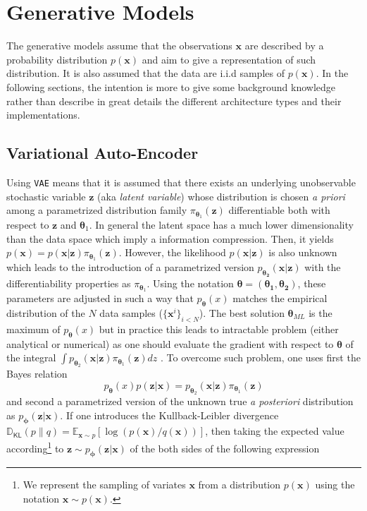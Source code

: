 \documentclass[11pt]{amsart}
\newcommand{\Esp}[0]{\ensuremath{\mathbb{E}}}
\newcommand{\DKL}[0]{\ensuremath{\mathbb{D}_{\mathsf{KL}}}}
\begin{document}
\section{Generative Models}
%
The generative models assume that the observations $\bm{x}$ are described by a probability distribution $p(\bm{x})$ and aim to give a representation of such distribution.  It is also assumed that the data are i.i.d samples of $p(\bm{x})$.  In the following sections, the intention is more to give some background knowledge rather than describe in great details the different  architecture types and their implementations.
%
\subsection{Variational Auto-Encoder}
%
Using \texttt{VAE} \citep{Kingma2014} means that it is assumed that there exists an underlying unobservable stochastic variable $\bm{z}$  (aka \textit{latent variable}) whose distribution is chosen \textit{a priori} among a parametrized distribution family $\pi_{\bm{\theta}_1}(\bm{z})$ differentiable both with respect to $\bm{z}$ and $\bm{\theta}_1$. In general the latent space has a much lower dimensionality than the data space which imply a information compression. Then, it yields $p(\bm{x}) = p(\bm{x}|\bm{z})\pi_{\bm{\theta}_1}(\bm{z})$. However, the likelihood  $p(\bm{x}|\bm{z})$ is also unknown which leads to the introduction of a parametrized version $p_{\bm{\theta_2}}(\bm{x}|\bm{z})$ with the differentiability properties as $\pi_{\bm{\theta}_1}$. Using the notation $\bm{\theta}=(\bm{\theta_1},\bm{\theta_2})$,  these parameters are adjusted in such a way that  $p_{\bm{\theta}}(x)$ matches the empirical distribution of the $N$ data samples ($\{\bm{x}^{i}\}_{i<N}$). The best solution $\bm{\theta}_{ML}$ is the maximum of $p_{\bm{\theta}}(x)$ but in practice this leads to  intractable problem (either analytical or numerical) as one should evaluate the gradient with respect to $\bm{\theta}$ of the integral 
$\int p_{\bm{\theta}_2}(\bm{x}|\bm{z})\pi_{\bm{\theta}_1}(\bm{z}) dz$ \citep{Kingma2014}. To overcome such problem, one uses first the Bayes relation
\begin{equation}
p_{\bm{\theta}}(x) p(\bm{z}|\bm{x}) = p_{\bm{\theta}_2}(\bm{x}|\bm{z})\pi_{\bm{\theta}_1}(\bm{z})
\end{equation}
and second a parametrized version of the unknown true \textit{a posteriori} distribution as $p_{\bm{\phi}}(\bm{z}|\bm{x})$. If one introduces the Kullback-Leibler divergence $\DKL(p\| q)=\Esp_{\bm{x}\sim p}[\log(p(\bm{x})/q(\bm{x}))]$, then taking the expected value according\footnote{We represent the sampling of variates $\bm{x}$ from a
distribution $p(\bm{x})$ using the notation $\bm{x}\sim p(\bm{x})$.} to $\bm{z}\sim p_{\bm{\phi}}(\bm{z}|\bm{x})$ of the both sides of the following expression
\end{document}
